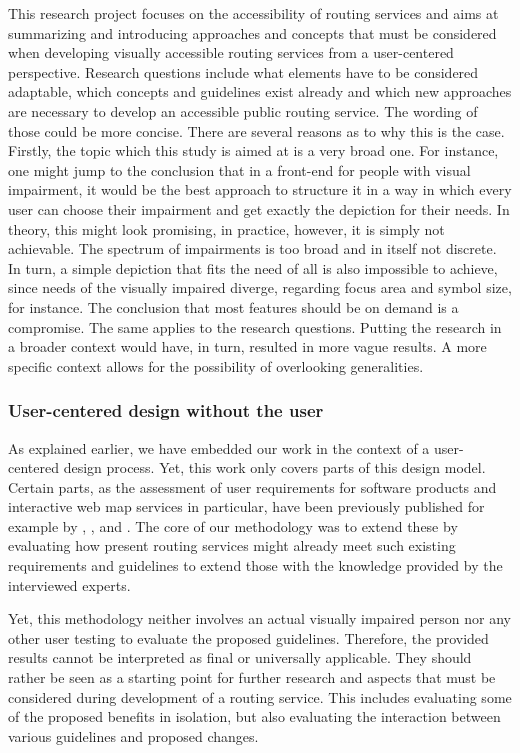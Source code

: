 \documentclass[agile, final]{copernicus-agile}
\begin{document}
This research project focuses on the accessibility of routing services and aims at summarizing and introducing approaches and concepts that must be considered when developing visually accessible routing services from a user-centered perspective. Research questions include what elements have to be considered adaptable, which concepts and guidelines exist already and which new approaches are necessary to develop an accessible public routing service. The wording of those could be more concise. There are several reasons as to why this is the case. Firstly, the topic which this study is aimed at is a very broad one. For instance, one might jump to the conclusion that in a front-end for people with visual impairment, it would be the best approach to structure it in a way in which every user can choose their impairment and get exactly the depiction for their needs. In theory, this might look promising, in practice, however, it is simply not achievable. The spectrum of impairments is too broad and in itself not discrete. In turn, a simple depiction that fits the need of all is also impossible to achieve, since needs of the visually impaired diverge, regarding focus area and symbol size, for instance. The conclusion that most features should be on demand is a compromise. The same applies to the research questions. Putting the research in a broader context would have, in turn, resulted in more vague results. A more specific context allows for the possibility of overlooking generalities.

\subsubsection{User-centered design without the user}

As explained earlier, we have embedded our work in the context of a user-centered design process. Yet, this work only covers parts of this design model. Certain parts, as the assessment of user requirements for software products and interactive web map services in particular, have been previously published for example by \citet{NeuschmidEA2012}, \citet{Delikostidis2011}, \citet{EngelEA2022} and \citet{AgrawalaStolte2000}. The core of our methodology was to extend these by evaluating how present routing services might already meet such existing requirements and guidelines to extend those with the knowledge provided by the interviewed experts. 

Yet, this methodology neither involves an actual visually impaired person nor any other user testing to evaluate the proposed guidelines. Therefore, the provided results cannot be interpreted as final or universally applicable. They should rather be seen as a starting point for further research and aspects that must be considered during development of a routing service. This includes evaluating some of the proposed benefits in isolation, but also evaluating the interaction between various guidelines and proposed changes. 
\end{document}
